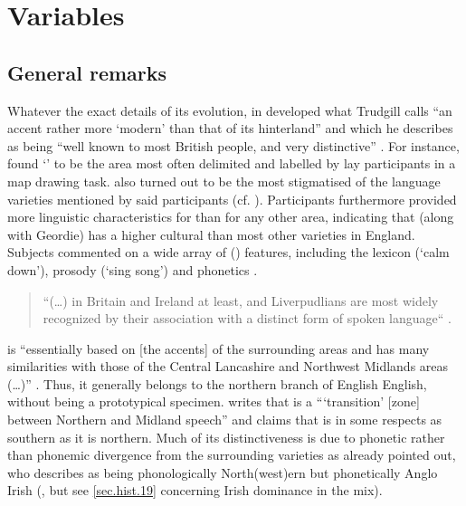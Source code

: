 \chapter{Variables}
\label{ch.var}

	\section{General remarks}\label{sec.var.general}

Whatever the exact details of its evolution, in  developed what Trudgill calls ``an accent rather more `modern' than that of its hinterland'' and which he describes as being ``well known to most British people, and very distinctive'' \citep[70]{trudgill1999}.
For instance, \citeauthor{montgomery2007} found `' to be the  area most often delimited and labelled by lay participants in a map drawing task.
 also turned out to be the most stigmatised of the language varieties mentioned by said participants (cf. \citeyear[194 and 254]{montgomery2007}).
Participants furthermore provided more linguistic characteristics for  than for any other  area, indicating that  (along with Geordie) has a higher cultural  than most other varieties in England.
Subjects commented on a wide array of () features, including the lexicon (`calm down'), prosody (`sing song') and phonetics \citep[cf.][180--181]{montgomery2007a}.
	\begin{quote}
		``(\dots) in Britain and Ireland at least,  and Liverpudlians are most widely recognized by their association with a distinct form of spoken language`` \citep[15]{crowley2012}.
	\end{quote}
 is ``essentially based on [the accents] of the surrounding areas and has many similarities with those of the Central Lancashire and Northwest Midlands areas (\dots)'' \citep[70]{trudgill1999}.
Thus, it generally belongs to the northern branch of English English, without being a prototypical specimen.
\citet[18]{wales2006} writes that  is a ```transition' [zone] between Northern and Midland  speech'' and \citet[72]{trudgill1999} claims that  is in some respects as southern as it is northern.
Much of its distinctiveness is due to phonetic rather than phonemic divergence from the surrounding varieties as \citet{knowles1973} already pointed out, who describes  as being phonologically North(west)ern but phonetically Anglo Irish (\citealt[cf. also][80]{knowles1978}, but see \ref{sec.hist.19} concerning Irish dominance in the  mix).

